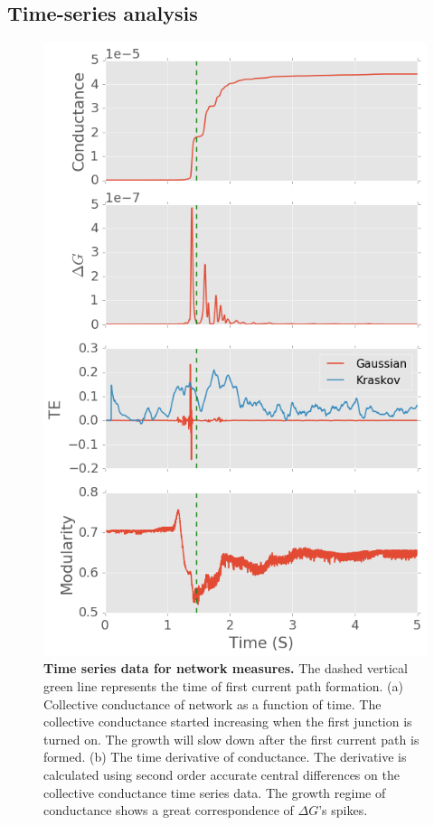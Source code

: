 \documentclass[%
 reprint,
 amsmath,amssymb,
 aps,
floatfix,
]{revtex4-2}
\begin{document}
\subsection{Time-series analysis}

\begin{figure}
	\centering
	\includegraphics[width=0.95\linewidth]{figure/time_series}
	\caption{\textbf{Time series data for network measures.} The dashed vertical green line represents the 			time of first current path formation.
			\newline (a) Collective conductance of network as a function of time. The collective conductance started increasing when the first junction is turned on. The growth will slow down after the first current path is formed.
			\newline (b) The time derivative of conductance. The derivative is calculated using second order accurate central differences on the collective conductance time series data. The growth regime of conductance shows a great correspondence of $\Delta G$'s spikes.
}
\end{figure}
\end{document}

